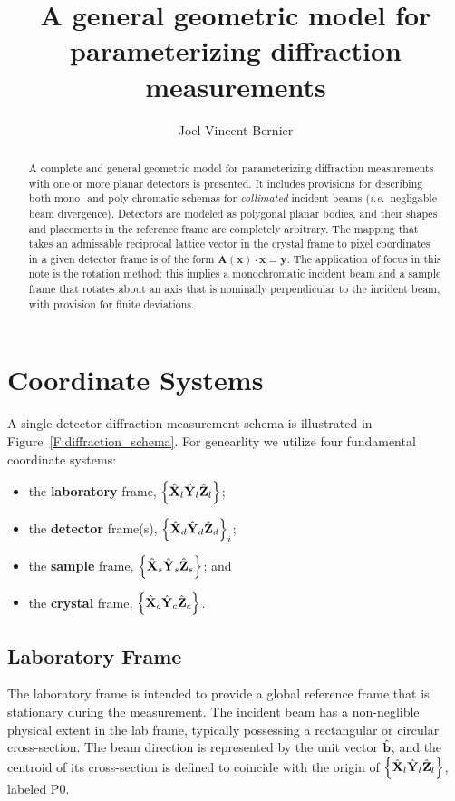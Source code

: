 \documentclass[12pt,letterpaper,final]{amsart}
\author{Joel Vincent Bernier}
\title{A general geometric model for parameterizing diffraction measurements}
\newcommand{\mbm}[1]{\ensuremath{\mbox{\boldmath$#1$}}}
\newcommand{\bhat}{\ensuremath{\hat{\mbm{\mathrm{b}}}}}
\newcommand{\Pzero}{\ensuremath{\mathrm{P0}}}
\newcommand{\Xl}{\ensuremath{\hat{\mbm{\mathrm{X}}}_l}}
\newcommand{\Yl}{\ensuremath{\hat{\mbm{\mathrm{Y}}}_l}}
\newcommand{\Zl}{\ensuremath{\hat{\mbm{\mathrm{Z}}}_l}}
\newcommand{\labframe}{\ensuremath{\left\{\Xl\Yl\Zl\right\}}}
\newcommand{\Xd}{\ensuremath{\hat{\mbm{\mathrm{X}}}_d}}
\newcommand{\Yd}{\ensuremath{\hat{\mbm{\mathrm{Y}}}_d}}
\newcommand{\Zd}{\ensuremath{\hat{\mbm{\mathrm{Z}}}_d}}
\newcommand{\detframe}{\ensuremath{\left\{\Xd\Yd\Zd\right\}}}
\newcommand{\Xs}{\ensuremath{\hat{\mbm{\mathrm{X}}}_s}}
\newcommand{\Ys}{\ensuremath{\hat{\mbm{\mathrm{Y}}}_s}}
\newcommand{\Zs}{\ensuremath{\hat{\mbm{\mathrm{Z}}}_s}}
\newcommand{\samframe}{\ensuremath{\left\{\Xs\Ys\Zs\right\}}}
\newcommand{\Xc}{\ensuremath{\hat{\mbm{\mathrm{X}}}_c}}
\newcommand{\Yc}{\ensuremath{\hat{\mbm{\mathrm{Y}}}_c}}
\newcommand{\Zc}{\ensuremath{\hat{\mbm{\mathrm{Z}}}_c}}
\newcommand{\xtlframe}{\ensuremath{\left\{\Xc\Yc\Zc\right\}}}
\newcommand{\figref}[1]{Figure~\ref{#1}}
\newcommand{\ie}{{\em i.e.}}
\begin{document}
\maketitle
\begin{abstract}
A complete and general geometric model for parameterizing diffraction
measurements with one or more planar detectors is presented.  It includes provisions for describing both mono- and poly-chromatic schemas for {\em collimated} incident beams (\ie\ negligable beam divergence).  Detectors are modeled as polygonal planar bodies, and their shapes and placements in the reference frame are completely arbitrary.  The mapping that takes an admissable reciprocal lattice vector in the crystal frame to pixel coordinates in a given
detector frame is of the form $\mathbf{A}(\mathbf{x})\cdot\mathbf{x} =
\mathbf{y}$.  The application of focus in this note is the rotation
method; this implies a monochromatic incident beam and a sample frame
that rotates about an axis that is nominally perpendicular to the
incident beam, with provision for finite deviations.
\end{abstract}

\section{Coordinate Systems}

A single-detector diffraction measurement schema is illustrated in
\figref{F:diffraction_schema}.  For genearlity we utilize four
fundamental coordinate systems:
\begin{itemize}
  \item the {\bf laboratory} frame, \labframe;
  \item the {\bf detector} frame(s), $\detframe_i$;
  \item the {\bf sample} frame, \samframe; and
  \item the {\bf crystal} frame, \xtlframe.
\end{itemize}

\subsection{Laboratory Frame}\label{S:laboratory}
The laboratory frame is intended to provide a global reference frame
that is stationary during the measurement.  The incident beam has a
non-neglible physical extent in the lab frame, typically possessing a
rectangular or circular cross-section.  The beam direction is
represented by the unit vector \bhat, and the centroid of its
cross-section is defined to coincide with the origin of \labframe,
labeled \Pzero.
\end{document}
